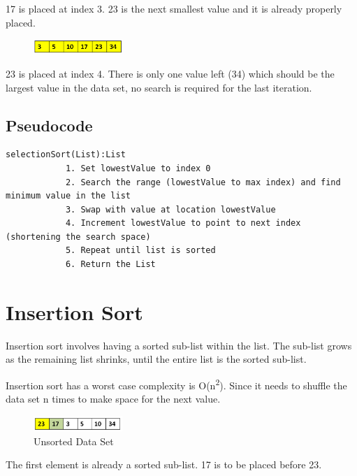 17 is placed at index 3. 23 is the next smallest value and it is already properly placed.

\begin{figure}[H]
\centering
\includegraphics[width=0.3\textwidth]{pictures/selection6.png}
\label{fig:selection6}
\end{figure}

23 is placed at index 4. There is only one value left (34) which should be the largest value in the data set, no search is required for the last iteration.

\subsection{Pseudocode}

\begin{verbatim}
selectionSort(List):List
            1. Set lowestValue to index 0
            2. Search the range (lowestValue to max index) and find minimum value in the list
            3. Swap with value at location lowestValue
            4. Increment lowestValue to point to next index (shortening the search space)
            5. Repeat until list is sorted
            6. Return the List
\end{verbatim}


\section{Insertion Sort}
Insertion sort involves having a sorted sub-list within the list. The sub-list grows as the remaining list shrinks, until the entire list is the sorted sub-list. \newline

Insertion sort has a worst case complexity is O(n\textsuperscript{2}). Since it needs to shuffle the data set n times to make space for the next value. \newline

\begin{figure}[H]
\centering
\includegraphics[width=0.3\textwidth]{pictures/insert1.png}
\caption{Unsorted Data Set}
\label{fig:insert1}
\end{figure}

The first element is already a sorted sub-list. 17 is to be placed before 23.

